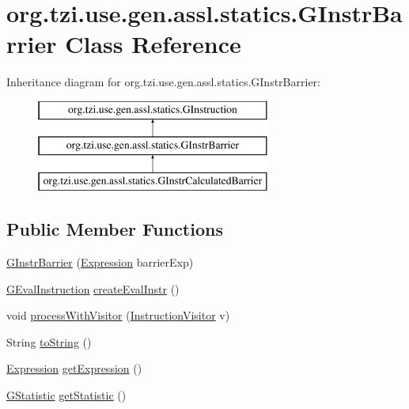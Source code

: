 \hypertarget{classorg_1_1tzi_1_1use_1_1gen_1_1assl_1_1statics_1_1_g_instr_barrier}{\section{org.\-tzi.\-use.\-gen.\-assl.\-statics.\-G\-Instr\-Barrier Class Reference}
\label{classorg_1_1tzi_1_1use_1_1gen_1_1assl_1_1statics_1_1_g_instr_barrier}
}
Inheritance diagram for org.\-tzi.\-use.\-gen.\-assl.\-statics.\-G\-Instr\-Barrier\-:\begin{figure}[H]
\begin{center}
\leavevmode
\includegraphics[height=3.000000cm]{classorg_1_1tzi_1_1use_1_1gen_1_1assl_1_1statics_1_1_g_instr_barrier}
\end{center}
\end{figure}
\subsection*{Public Member Functions}
\begin{DoxyCompactItemize}
\item 
\hyperlink{classorg_1_1tzi_1_1use_1_1gen_1_1assl_1_1statics_1_1_g_instr_barrier_acc6ce6921845f2e0b117e18683844a73}{G\-Instr\-Barrier} (\hyperlink{classorg_1_1tzi_1_1use_1_1uml_1_1ocl_1_1expr_1_1_expression}{Expression} barrier\-Exp)
\item 
\hyperlink{classorg_1_1tzi_1_1use_1_1gen_1_1assl_1_1dynamics_1_1_g_eval_instruction}{G\-Eval\-Instruction} \hyperlink{classorg_1_1tzi_1_1use_1_1gen_1_1assl_1_1statics_1_1_g_instr_barrier_a763be83e4e44cacad1f7cf80735b7a74}{create\-Eval\-Instr} ()
\item 
void \hyperlink{classorg_1_1tzi_1_1use_1_1gen_1_1assl_1_1statics_1_1_g_instr_barrier_a84fb27619d56ac01edb5f21898f74a12}{process\-With\-Visitor} (\hyperlink{interfaceorg_1_1tzi_1_1use_1_1gen_1_1assl_1_1statics_1_1_instruction_visitor}{Instruction\-Visitor} v)
\item 
String \hyperlink{classorg_1_1tzi_1_1use_1_1gen_1_1assl_1_1statics_1_1_g_instr_barrier_a4cb73e5ce5458ff61c04f4c1278a0cc8}{to\-String} ()
\item 
\hyperlink{classorg_1_1tzi_1_1use_1_1uml_1_1ocl_1_1expr_1_1_expression}{Expression} \hyperlink{classorg_1_1tzi_1_1use_1_1gen_1_1assl_1_1statics_1_1_g_instr_barrier_a720fbbb66849639b0ced125af36356e7}{get\-Expression} ()
\item 
\hyperlink{classorg_1_1tzi_1_1use_1_1gen_1_1tool_1_1statistics_1_1_g_statistic}{G\-Statistic} \hyperlink{classorg_1_1tzi_1_1use_1_1gen_1_1assl_1_1statics_1_1_g_instr_barrier_a64f3ff1d78662070253d27bfe6b1631a}{get\-Statistic} ()
\end{DoxyCompactItemize}


